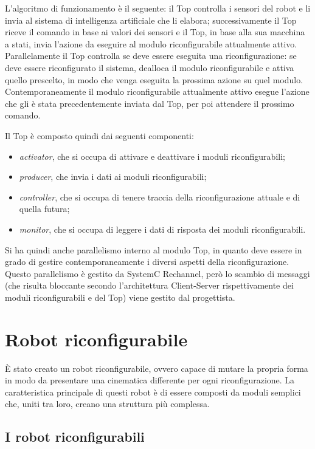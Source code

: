 \documentclass[a4paper,titlepage]{book}
\begin{document}
L'algoritmo di funzionamento è il seguente: il Top controlla i sensori del robot e li invia al sistema di intelligenza artificiale che li elabora; successivamente il Top riceve il comando in base ai valori dei sensori e il Top, in base alla sua macchina a stati, invia l'azione da eseguire al modulo riconfigurabile attualmente attivo.
Parallelamente il Top controlla se deve essere eseguita una riconfigurazione: se deve essere riconfigurato il sistema, dealloca il modulo riconfigurabile e attiva quello prescelto, in modo che venga eseguita la prossima azione su quel modulo.
Contemporaneamente il modulo riconfigurabile attualmente attivo esegue l'azione che gli è stata precedentemente inviata dal Top, per poi attendere il prossimo comando.

Il Top è composto quindi dai seguenti componenti:

\begin{itemize}
  \item \textit{activator}, che si occupa di attivare e deattivare i moduli riconfigurabili;
  \item \textit{producer}, che invia i dati ai moduli riconfigurabili;
  \item \textit{controller}, che si occupa di tenere traccia della riconfigurazione attuale e di quella futura;
  \item \textit{monitor}, che si occupa di leggere i dati di risposta dei moduli riconfigurabili.
\end{itemize}

Si ha quindi anche parallelismo interno al modulo Top, in quanto deve essere in grado di gestire contemporaneamente i diversi aspetti della riconfigurazione. Questo parallelismo è gestito da SystemC Rechannel, però lo scambio di messaggi (che risulta bloccante secondo l'architettura Client-Server rispettivamente dei moduli riconfigurabili e del Top) viene gestito dal progettista.

\section{Robot riconfigurabile}

È stato creato un robot riconfigurabile, ovvero capace di mutare la propria forma in modo da presentare una cinematica differente per ogni riconfigurazione. La caratteristica principale di questi robot è di essere composti da moduli semplici che, uniti tra loro, creano una struttura più complessa.


\subsection{I robot riconfigurabili}
\end{document}
